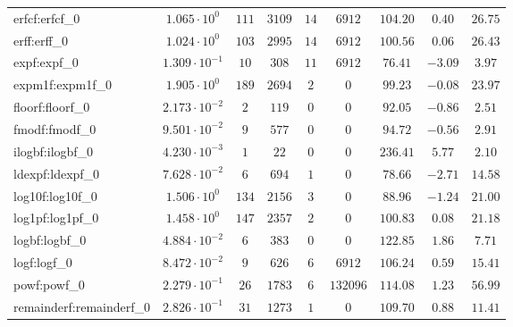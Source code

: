 \begin{tabular}{|l|c|c|c|c|c|c|c|c|}
erfcf:erfcf\_0               & $ 1.065 \cdot 10^{0}  $ & $ 111    $ & $ 3109  $ & $ 14  $ & $ 6912   $ & $ 104.20      $ & $ 0.40    $ & $ 26.75   $ \\
erff:erff\_0                 & $ 1.024 \cdot 10^{0}  $ & $ 103    $ & $ 2995  $ & $ 14  $ & $ 6912   $ & $ 100.56      $ & $ 0.06    $ & $ 26.43   $ \\
expf:expf\_0                 & $ 1.309 \cdot 10^{-1} $ & $ 10     $ & $ 308   $ & $ 11  $ & $ 6912   $ & $ 76.41       $ & $ -3.09   $ & $ 3.97    $ \\
expm1f:expm1f\_0             & $ 1.905 \cdot 10^{0}  $ & $ 189    $ & $ 2694  $ & $ 2   $ & $ 0      $ & $ 99.23       $ & $ -0.08   $ & $ 23.97   $ \\
floorf:floorf\_0             & $ 2.173 \cdot 10^{-2} $ & $ 2      $ & $ 119   $ & $ 0   $ & $ 0      $ & $ 92.05       $ & $ -0.86   $ & $ 2.51    $ \\
fmodf:fmodf\_0               & $ 9.501 \cdot 10^{-2} $ & $ 9      $ & $ 577   $ & $ 0   $ & $ 0      $ & $ 94.72       $ & $ -0.56   $ & $ 2.91    $ \\
ilogbf:ilogbf\_0             & $ 4.230 \cdot 10^{-3} $ & $ 1      $ & $ 22    $ & $ 0   $ & $ 0      $ & $ 236.41      $ & $ 5.77    $ & $ 2.10    $ \\
ldexpf:ldexpf\_0             & $ 7.628 \cdot 10^{-2} $ & $ 6      $ & $ 694   $ & $ 1   $ & $ 0      $ & $ 78.66       $ & $ -2.71   $ & $ 14.58   $ \\
log10f:log10f\_0             & $ 1.506 \cdot 10^{0}  $ & $ 134    $ & $ 2156  $ & $ 3   $ & $ 0      $ & $ 88.96       $ & $ -1.24   $ & $ 21.00   $ \\
log1pf:log1pf\_0             & $ 1.458 \cdot 10^{0}  $ & $ 147    $ & $ 2357  $ & $ 2   $ & $ 0      $ & $ 100.83      $ & $ 0.08    $ & $ 21.18   $ \\
logbf:logbf\_0               & $ 4.884 \cdot 10^{-2} $ & $ 6      $ & $ 383   $ & $ 0   $ & $ 0      $ & $ 122.85      $ & $ 1.86    $ & $ 7.71    $ \\
logf:logf\_0                 & $ 8.472 \cdot 10^{-2} $ & $ 9      $ & $ 626   $ & $ 6   $ & $ 6912   $ & $ 106.24      $ & $ 0.59    $ & $ 15.41   $ \\
powf:powf\_0                 & $ 2.279 \cdot 10^{-1} $ & $ 26     $ & $ 1783  $ & $ 6   $ & $ 132096 $ & $ 114.08      $ & $ 1.23    $ & $ 56.99   $ \\
remainderf:remainderf\_0     & $ 2.826 \cdot 10^{-1} $ & $ 31     $ & $ 1273  $ & $ 1   $ & $ 0      $ & $ 109.70      $ & $ 0.88    $ & $ 11.41   $ \\

\end{tabular}
